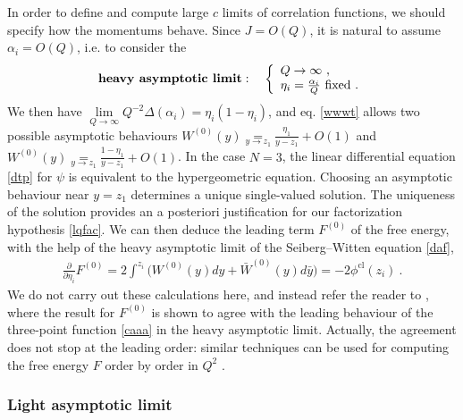 \documentclass[12pt, a4paper, notitlepage, twoside]{report}
\numberwithin{equation}{section}
\theoremstyle{break}
\begin{document}
In order to define and compute large $c$ limits of correlation functions, we should specify how the momentums behave.
Since $J=O(Q)$, it is natural to assume $\alpha_i=O(Q)$, i.e. to consider the 
\begin{align}
 \textbf{\boldmath heavy\ asymptotic\ limit}\index{heavy\ asymptotic\ limit}: \quad \left\{\begin{array}{l}  Q \to \infty \ ,\\ \eta_i=\frac{\alpha_i}{Q}\ \text{fixed}\ .\end{array}\right.  
\end{align}
We then have $\underset{Q\to\infty}{\lim} Q^{-2}\Delta(\alpha_i)=\eta_i(1-\eta_i)$, and eq. \eqref{wwwt} allows two possible asymptotic behaviours $W^{(0)}(y)\underset{y\to z_1}{=} \frac{\eta_1}{y-z_1} + O(1)$ and 
$W^{(0)}(y)\underset{y\to z_1}{=} \frac{1-\eta_1}{y-z_1} + O(1)$.
In the case $N=3$, the linear differential equation \eqref{dtp} for $\psi$ is equivalent to the hypergeometric equation.
Choosing an asymptotic behaviour near $y=z_1$ determines a unique single-valued solution.
The uniqueness of the solution provides an a posteriori justification for our factorization hypothesis \eqref{lqfac}.
We can then deduce the leading term $F^{(0)}$ of the free energy, with the help of the heavy asymptotic limit of the Seiberg--Witten equation \eqref{daf}, 
\begin{align}
 {\frac{\partial}{\partial \eta_i}} F^{(0)} = 2\int^{z_i}\Big( W^{(0)}(y)dy + \bar W^{(0)}(y)d\bar y\Big) = -2\phi^\text{cl}(z_i)\ .
\end{align}
We do not carry out these calculations here, and instead refer the reader to \cite{zz95}, where the result for $F^{(0)}$ is shown to agree with the leading behaviour of the three-point function \eqref{caaa} in the heavy asymptotic limit.
Actually, the agreement does not stop at the leading order: similar techniques can be used for computing the free energy $F$ order by order in $Q^2$ \cite{cer12}.

\subsubsection{Light asymptotic limit}
\end{document}
